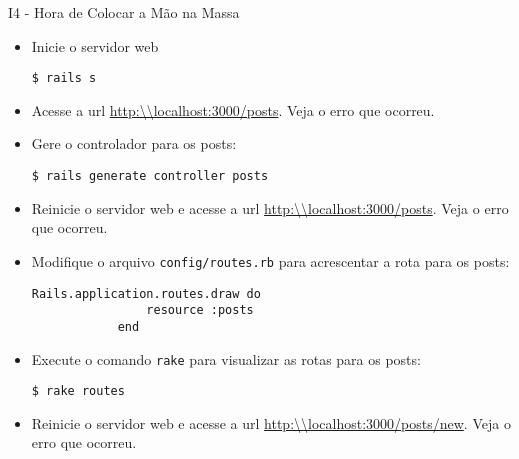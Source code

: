 \begin{frame}{I4 - Hora de Colocar a Mão na Massa}
	\begin{itemize}
		
		\item Inicie o servidor web
		\begin{lstlisting}[style=BashInputBasicStyle]
			$ rails s
		\end{lstlisting}
		
		\item Acesse a url \url{http:\\localhost:3000/posts}. Veja o erro que ocorreu.
		
		\item Gere o controlador para os posts:
		\begin{lstlisting}[style=BashInputBasicStyle]
			$ rails generate controller posts
		\end{lstlisting}
		
		\item Reinicie o servidor web e acesse a url \url{http:\\localhost:3000/posts}. Veja o erro que ocorreu.
		
		\item Modifique o arquivo \verb|config/routes.rb| para acrescentar a rota para
		os posts:
		\begin{lstlisting}[style=RubyInputStyle]
			Rails.application.routes.draw do 
				resource :posts
			end 
		\end{lstlisting}	
		
		\item Execute o comando \verb!rake! para visualizar as rotas para os
		posts:
		\begin{lstlisting}[style=BashInputBasicStyle]
			$ rake routes
		\end{lstlisting}
		
		\item Reinicie o servidor web e acesse a url \url{http:\\localhost:3000/posts/new}. Veja o erro que ocorreu.

		
	\end{itemize}
\end{frame}